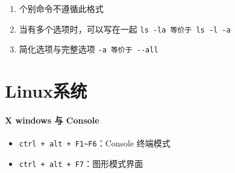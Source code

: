 \documentclass[UTF8,a4paper,12pt]{ctexbook}
\begin{document}
	 \begin{enumerate}[itemindent = 1em]
	 	\item 个别命令不遵循此格式
	 	\item 当有多个选项时，可以写在一起 \verb|ls -la 等价于 ls -l -a|
	 	\item 简化选项与完整选项 \verb|-a 等价于 --all|
	 \end{enumerate}
	\section{Linux系统} 
		\paragraph{X windows 与 Console}
			\begin{itemize}[itemindent = 1em]
				\item \verb|ctrl + alt + F1~F6|：Console 终端模式
				\item \verb|ctrl + alt + F7|：图形模式界面
			\end{itemize}
		
\end{document}
